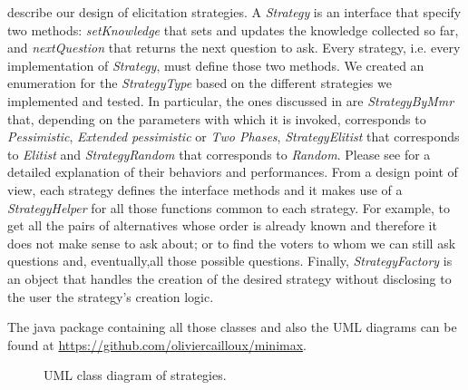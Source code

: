  describe our design of elicitation strategies. A \textit{Strategy} is an interface that specify two methods: \textit{setKnowledge} that sets and updates the knowledge collected so far, and \textit{nextQuestion} that returns the next question to ask. Every strategy, i.e. every implementation of \textit{Strategy}, must define those two methods. We created an enumeration for the \textit{StrategyType} based on the different strategies we implemented and tested.
In particular, the ones discussed in  are \textit{StrategyByMmr} that, depending on the parameters with which it is invoked, corresponds to \textit{Pessimistic}, \textit{Extended pessimistic} or \textit{Two Phases}, \textit{StrategyElitist} that corresponds to \textit{Elitist} and \textit{StrategyRandom} that corresponds to \textit{Random}.
Please see  for a detailed explanation of their behaviors and performances.
From a design point of view, each strategy defines the interface methods and it makes use of a \textit{StrategyHelper} for all those functions common to each strategy. For example, to get all the pairs of alternatives whose order is already known and therefore it does not make sense to ask about; or to find the voters to whom we can still ask questions and, eventually,all those possible questions.
Finally, \textit{StrategyFactory} is an object that handles the creation of the desired strategy without disclosing to the user the strategy's creation logic.

The java package containing all those classes and also the UML diagrams can be found at \url{https://github.com/oliviercailloux/minimax}.

\begin{sidewaysfigure}
	\centering
	
	\caption{UML class diagram of strategies.}
	\label{uml:strategies}
\end{sidewaysfigure}
